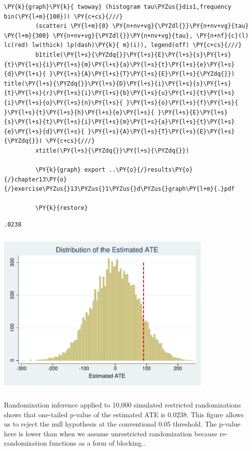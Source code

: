 \documentclass[11pt,notitlepage]{article}\usepackage[]{graphicx}\usepackage[]{color}
\makeatletter
\newenvironment{kframe}{%
 \def\at@end@of@kframe{}%
 \ifinner\ifhmode%
  \def\at@end@of@kframe{\end{minipage}}%
  \begin{minipage}{\columnwidth}%
 \fi\fi%
 \def\FrameCommand##1{\hskip\@totalleftmargin \hskip-\fboxsep
 \colorbox{shadecolor}{##1}\hskip-\fboxsep
     \hskip-\linewidth \hskip-\@totalleftmargin \hskip\columnwidth}%
 \MakeFramed {\advance\hsize-\width
   \@totalleftmargin\z@ \linewidth\hsize
   \@setminipage}}%
 {\par\unskip\endMakeFramed%
 \at@end@of@kframe}
\newenvironment{knitrout}{}{} %
\makeatother
\begin{document}
\begin{enumerate}[a)]
\begin{knitrout}
\begin{kframe}
\begin{Verbatim}[commandchars=\\\{\}]
         \PY{k}{graph}\PY{k}{ twoway} (histogram tau\PYZus{}dis1,frequency bin(\PY{l+m}{100})) \PY{c+cs}{///}
         (scatteri \PY{l+m}{0} \PY{n+nv+vg}{\PYZdl{}}\PY{n+nv+vg}{tau} \PY{l+m}{300} \PY{n+nv+vg}{\PYZdl{}}\PY{n+nv+vg}{tau}, \PY{n+nf}{c}(l) lc(red) lw(thick) lp(dash)\PY{k}{ m}(i)), legend(off) \PY{c+cs}{///}
         b1title(\PY{l+s}{\PYZdq{}}\PY{l+s}{E}\PY{l+s}{s}\PY{l+s}{t}\PY{l+s}{i}\PY{l+s}{m}\PY{l+s}{a}\PY{l+s}{t}\PY{l+s}{e}\PY{l+s}{d}\PY{l+s}{ }\PY{l+s}{A}\PY{l+s}{T}\PY{l+s}{E}\PY{l+s}{\PYZdq{}}) title(\PY{l+s}{\PYZdq{}}\PY{l+s}{D}\PY{l+s}{i}\PY{l+s}{s}\PY{l+s}{t}\PY{l+s}{r}\PY{l+s}{i}\PY{l+s}{b}\PY{l+s}{u}\PY{l+s}{t}\PY{l+s}{i}\PY{l+s}{o}\PY{l+s}{n}\PY{l+s}{ }\PY{l+s}{o}\PY{l+s}{f}\PY{l+s}{ }\PY{l+s}{t}\PY{l+s}{h}\PY{l+s}{e}\PY{l+s}{ }\PY{l+s}{E}\PY{l+s}{s}\PY{l+s}{t}\PY{l+s}{i}\PY{l+s}{m}\PY{l+s}{a}\PY{l+s}{t}\PY{l+s}{e}\PY{l+s}{d}\PY{l+s}{ }\PY{l+s}{A}\PY{l+s}{T}\PY{l+s}{E}\PY{l+s}{\PYZdq{}}) \PY{c+cs}{///}
         xtitle(\PY{l+s}{\PYZdq{}}\PY{l+s}{\PYZdq{}}) 
         
         \PY{k}{graph} export ..\PY{o}{/}results\PY{o}{/}chapter13\PY{o}{/}exercise\PYZus{}13\PYZus{}1\PYZus{}d\PYZus{}graph\PY{l+m}{.}pdf	
         
         \PY{k}{restore}
\end{Verbatim}

    \begin{Verbatim}[commandchars=\\\{\}]
.0238

    \end{Verbatim}
\end{kframe}

{\centering \includegraphics[width=4.2in,height=3.3in]{figure/PS13-unnamed-chunk-4-1} 

}



\end{knitrout}

Randomization inference applied to 10,000 simulated restricted randomizations shows that one-tailed p-value of the estimated ATE is 0.0238. This figure allows us to reject the null hypothesis at the conventional 0.05 threshold.  The p-value here is lower than when we assume unrestricted randomization because re-randomization functions as a form of blocking..
\end{enumerate}
\end{document}
